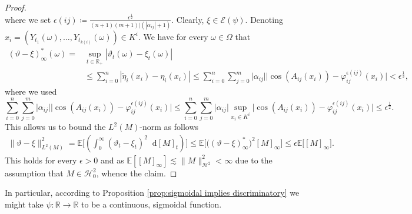 \documentclass[11pt,a4paper,twoside,openany]{report}
\numberwithin{equation}{section}
\newcommand{\diff}{\mathop{}\!\mathrm{d}}
\theoremstyle{plain} %
\theoremstyle{definition} %
\theoremstyle{remark} %
\begin{document}
\begin{proof}
\begin{equation*}
\end{equation*}
where we set \(\epsilon(ij)\coloneqq\frac{\epsilon^{\frac{1}{2}}}{(n+1)(m+1)|(|\alpha_{ij}|+1)}\). Clearly, \(\xi\in\mathcal{E}(\psi)\). Denoting \(x_i=(Y_{t_1}(\omega),\dots,Y_{t_{k(i)}}(\omega))\in K^i\). We have for every \(\omega\in\Omega\) that 
\begin{align*}
    (\vartheta-\xi)^*_{\infty}(\omega)=&\sup_{t\in\mathbb{R}_+}|\vartheta_t(\omega)-\xi_t(\omega)|
    \\&\leq \sum_{i=0}^{n}|\widetilde{\eta}_i(x_i)-\eta_i(x_i)|\leq \sum_{i=0}^{n}\sum_{j=0}^m\big|\alpha_{ij}\big|\big|\cos(A_{ij}(x_i))-\varphi_{ij}^{\epsilon(ij)}(x_i)\big|<\epsilon^{\frac{1}{2}},
\end{align*}
where we used
\begin{equation*}
\sum_{i=0}^{n}\sum_{j=0}^m\big|\alpha_{ij}\big|\big|\cos(A_{ij}(x_i))-\varphi_{ij}^{\epsilon(ij)}(x_i)\big|
\leq \sum_{i=0}^{n}\sum_{j=0}^m\big|\alpha_{ij}\big|\sup_{x_i\in K^i}\big|\cos(A_{ij}(x_i))-\varphi_{ij}^{\epsilon(ij)}(x_i)\big|\leq
\epsilon^{\frac{1}{2}}.
\end{equation*}
This allows us to bound the \(L^2(M)\)-norm as follows
\begin{align*}
    \lVert\vartheta-\xi\rVert_{L^2(M)}^2=\mathbb{E}\bigg[\left(\int_{0}^{\infty}(\vartheta_t-\xi_t)^2\diff [M]_t\right)\bigg]\leq \mathbb{E}\big[\big((\vartheta-\xi)_{\infty}^*\big)^2[M]_{\infty}\big]\leq\epsilon\mathbb{E}\big[[M]_{\infty}\big].
\end{align*}
This holds for every \(\epsilon>0\) and as
\(\mathbb{E}[[M]_{\infty}]\lesssim\lVert M\rVert_{\mathcal{H}^2}^2<\infty\) due to the assumption that \(M\in\mathcal{H}^2_0\), whence the claim.
\end{proof}
In particular, according to Proposition \ref{prop:sigmoidal implies discriminatory} we might take \(\psi:\mathbb{R}\to\mathbb{R}\) to be a continuous, sigmoidal function. 
\end{document}
